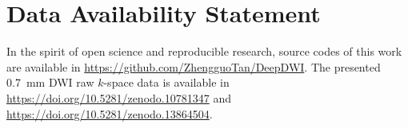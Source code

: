 \documentclass[AMA,STIX2COL,Linenumberson]{MRM}
\begin{document}
\section*{Data Availability Statement}
In the spirit of open science and reproducible research,
source codes of this work are available in \url{https://github.com/ZhengguoTan/DeepDWI}.
The presented \SI{0.7}{mm} DWI raw $k$-space data is available in 
\url{https://doi.org/10.5281/zenodo.10781347} and 
\url{https://doi.org/10.5281/zenodo.13864504}.

\vfill\pagebreak

\end{document}
